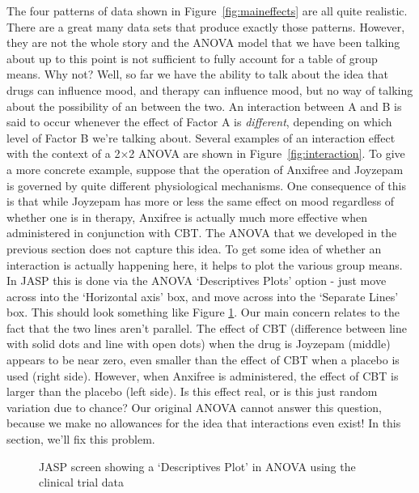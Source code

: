 The four patterns of data shown in Figure~\ref{fig:maineffects} are all quite realistic. There are a great many data sets that produce exactly those patterns. However, they are not the whole story and the ANOVA model that we have been talking about up to this point is not sufficient to fully account for a table of group means. Why not? Well, so far we have the ability to talk about the idea that drugs can influence mood, and therapy can influence mood, but no way of talking about the possibility of an  between the two. An interaction between A and B is said to occur whenever the effect of Factor A is {\it different}, depending on which level of Factor B we're talking about. Several examples of an interaction effect with the context of a 2$\times$2 ANOVA are shown in Figure~\ref{fig:interaction}. To give a more concrete example, suppose that the operation of Anxifree and Joyzepam is governed by quite different physiological mechanisms. One consequence of this is that while Joyzepam has more or less the same effect on mood regardless of whether one is in therapy, Anxifree is actually much more effective when administered in conjunction with CBT. The ANOVA that we developed in the previous section does not capture this idea. To get some idea of whether an interaction is actually happening here, it helps to plot the various group means. In JASP this is done via the ANOVA `Descriptives Plots' option - just move  across into the `Horizontal axis' box, and move  across into the `Separate Lines' box. This should look something like Figure \ref{fig:interactionplot}. Our main concern relates to the fact that the two lines aren't parallel. The effect of CBT (difference between line with solid dots and line with open dots) when the drug is Joyzepam (middle) appears to be near zero, even smaller than the effect of CBT when a placebo is used (right side). However, when Anxifree is administered, the effect of CBT is larger than the placebo (left side). Is this effect real, or is this just random variation due to chance? Our original ANOVA cannot answer this question, because we make no allowances for the idea that interactions even exist! In this section, we'll fix this problem.

\vspace{0.5cm}
\begin{figure}[!htb]
\begin{center}
\caption{JASP screen showing a `Descriptives Plot' in ANOVA using the clinical trial data}
\label{fig:interactionplot}
\HR
\end{center}
\end{figure}

